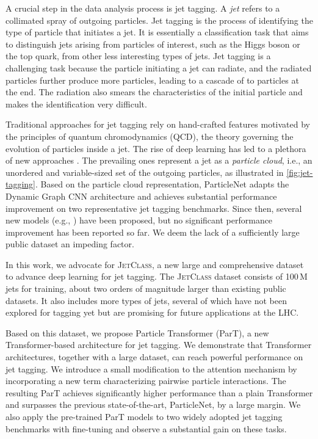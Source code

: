 \documentclass[nohyperref]{article}
\theoremstyle{plain}
\theoremstyle{definition}
\theoremstyle{remark}
\newcommand{\jetclass}{{\textsc{JetClass}}\xspace}
\begin{document}
A crucial step in the data analysis process is jet tagging. A \textit{jet} refers to a collimated spray of outgoing particles. Jet tagging is the process of identifying the type of particle that initiates a jet. It is essentially a classification task that aims to distinguish jets arising from particles of interest, such as the Higgs boson or the top quark, from other less interesting types of jets. Jet tagging is a challenging task because the particle initiating a jet can radiate, and the radiated particles further produce more particles, leading to a cascade of  to  particles at the end. The radiation also smears the characteristics of the initial particle and makes the identification very difficult. 

Traditional approaches for jet tagging rely on hand-crafted features motivated by the principles of quantum chromodynamics (QCD), the theory governing the evolution of particles inside a jet. The rise of deep learning has led to a plethora of new approaches \cite{Larkoski:2017jix}. The prevailing ones represent a jet as a \textit{particle cloud}, i.e., an unordered and variable-sized set of the outgoing particles, as illustrated in \cref{fig:jet-tagging}. Based on the particle cloud representation, ParticleNet \cite{Qu:2019gqs} adapts the Dynamic Graph CNN architecture \cite{dgcnn} and achieves substantial performance improvement on two representative jet tagging benchmarks. 
Since then, several new models (e.g., \citet{Mikuni:2020wpr,Mikuni:2021pou,Shimmin:2021pkm}) have been proposed, but no significant performance improvement has been reported so far. We deem the lack of a sufficiently large public dataset an impeding factor.

In this work, we advocate for \jetclass, a new large and comprehensive dataset to advance deep learning for jet tagging. The \jetclass dataset \cite{jetclass} consists of 100\,M jets for training, about two orders of magnitude larger than existing public datasets. It also includes more types of jets, several of which have not been explored for tagging yet but are promising for future applications at the LHC. 

Based on this dataset, we propose Particle Transformer (ParT), a new Transformer-based architecture for jet tagging. We demonstrate that Transformer architectures, together with a large dataset, can reach powerful performance on jet tagging. We introduce a small modification to the attention mechanism by incorporating a new term characterizing pairwise particle interactions. The resulting ParT achieves significantly higher performance than a plain Transformer and surpasses the previous state-of-the-art, ParticleNet, by a large margin. We also apply the pre-trained ParT models to two widely adopted jet tagging benchmarks with fine-tuning and observe a substantial gain on these tasks. 
\end{document}
